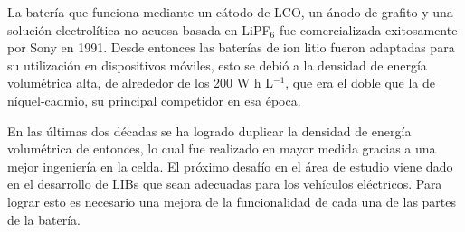 La batería que funciona mediante un cátodo de LCO, un ánodo de grafito y una
solución electrolítica no acuosa basada en LiPF$_6$ fue comercializada
exitosamente por Sony en 1991. Desde entonces las baterías de ion litio fueron
adaptadas para su utilización en dispositivos móviles, esto se debió a la
densidad de energía volumétrica alta, de alrededor de los 200 W h L$^{-1}$, que
era el doble que la de níquel-cadmio, su principal competidor en esa época.

En las últimas dos décadas se ha logrado duplicar la densidad de energía 
volumétrica de entonces, lo cual fue realizado en mayor medida gracias a una 
mejor ingeniería en la celda. El próximo desafío en el área de estudio viene 
dado en el desarrollo de LIBs que sean adecuadas para los vehículos eléctricos. 
Para lograr esto es necesario una mejora de la funcionalidad de cada una de las
partes de la batería.

